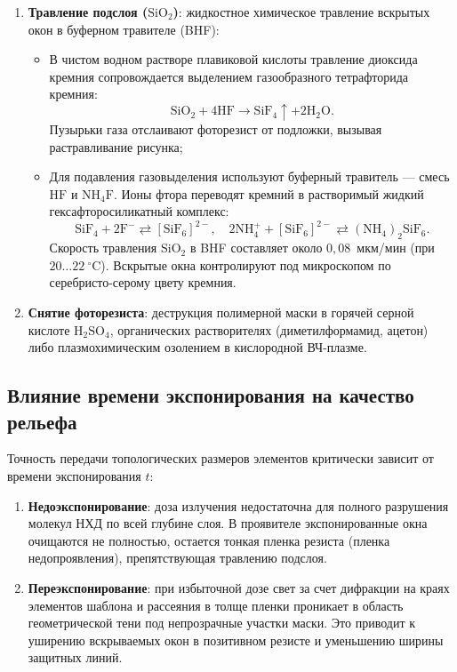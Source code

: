 \documentclass[12pt,a4paper]{article}
\theoremstyle{plain}
\theoremstyle{definition}
\theoremstyle{remark}
\numberwithin{equation}{section}
\begin{document}
\begin{enumerate}
  (до $140~^\circ\mathrm{C}$). Удаляются остатки проявителя и воды, происходит термическая сшивка смолы, 
  слой уплотняется, существенно возрастают его адгезия и химическая стойкость.
  \item \textbf{Травление подслоя ($\mathrm{SiO}_2$)}: жидкостное химическое травление вскрытых окон 
  в буферном травителе (BHF):
  \begin{itemize}
    \item В чистом водном растворе плавиковой кислоты травление диоксида кремния сопровождается 
    выделением газообразного тетрафторида кремния:
    \begin{equation*}
      \mathrm{SiO}_2 + 4\mathrm{HF} \to \mathrm{SiF}_4\uparrow + 2\mathrm{H}_2\mathrm{O}.
    \end{equation*}
    Пузырьки газа отслаивают фоторезист от подложки, вызывая растравливание рисунка;
    \item Для подавления газовыделения используют буферный травитель — смесь $\mathrm{HF}$ и $\mathrm{NH}_4\mathrm{F}$. 
    Ионы фтора переводят кремний в растворимый жидкий гексафторосиликатный комплекс:
    \begin{equation*}
      \mathrm{SiF}_4 + 2\mathrm{F}^- \rightleftarrows [\mathrm{SiF}_6]^{2-}, \quad 
      2\mathrm{NH}_4^+ + [\mathrm{SiF}_6]^{2-} \rightleftarrows (\mathrm{NH}_4)_2\mathrm{SiF}_6.
    \end{equation*}
    Скорость травления $\mathrm{SiO}_2$ в BHF составляет около $0{,}08$~мкм/мин (при $20 \dots 22~^\circ\mathrm{C}$). 
    Вскрытые окна контролируют под микроскопом по серебристо-серому цвету кремния.
  \end{itemize}
  \item \textbf{Снятие фоторезиста}: деструкция полимерной маски в горячей серной кислоте 
  $\mathrm{H}_2\mathrm{SO}_4$, органических растворителях (диметилформамид, ацетон) либо 
  плазмохимическим озолением в кислородной ВЧ-плазме.
\end{enumerate}

\subsection{Влияние времени экспонирования на качество рельефа}

Точность передачи топологических размеров элементов критически зависит от времени экспонирования $t$:
\begin{enumerate}
  \item \textbf{Недоэкспонирование}: доза излучения недостаточна для полного разрушения молекул НХД по 
  всей глубине слоя. В проявителе экспонированные окна очищаются не полностью, остается тонкая пленка 
  резиста (пленка недопроявления), препятствующая травлению подслоя.
  \item \textbf{Переэкспонирование}: при избыточной дозе свет за счет дифракции на краях элементов шаблона 
  и рассеяния в толще пленки проникает в область геометрической тени под непрозрачные участки маски. 
  Это приводит к уширению вскрываемых окон в позитивном резисте и уменьшению ширины защитных линий.
\end{enumerate}
\end{document}
